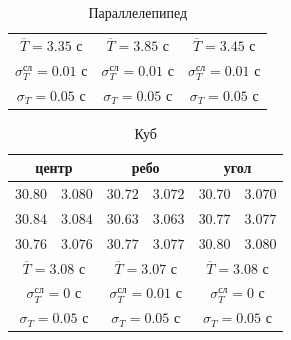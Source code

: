 \documentclass[a4paper,12pt]{article}
\begin{document}
\begin{enumerate}
\begin{table}[!h]
\begin{tabular}{|c|c|c|c|c|c|}
            \multicolumn{2}{|c|}{$\overline{T} = 3.35$ с} & \multicolumn{2}{|c|}{$\overline{T} = 3.85$ с} & \multicolumn{2}{|c|}{$\overline{T} = 3.45$ с} \\ 
            \multicolumn{2}{|c|}{$\sigma_T^{\text{сл}} = 0.01$ с} & \multicolumn{2}{|c|}{$\sigma_T^{\text{сл}} = 0.01$ с} & \multicolumn{2}{|c|}{$\sigma_T^{\text{сл}} = 0.01$ с} \\ 
            \multicolumn{2}{|c|}{$\sigma_T = 0.05$ с} & \multicolumn{2}{|c|}{$\sigma_T = 0.05$ с} & \multicolumn{2}{|c|}{$\sigma_T = 0.05$ с} \\ \hline
        \end{tabular}
        \caption{Параллелепипед}
    \end{table}

    \begin{table}[!h]
        \centering
        \begin{tabular}{|c|c|c|c|c|c|} \hline
            \multicolumn{2}{|c}{центр} & \multicolumn{2}{|c}{ребо} & \multicolumn{2}{|c|}{угол} \\ \hline
            $30.80$ & $3.080$ & $30.72$ & $3.072$ & $30.70$ & $3.070$ \\ \hline
            $30.84$ & $3.084$ & $30.63$ & $3.063$ & $30.77$ & $3.077$ \\ \hline
            $30.76$ & $3.076$ & $30.77$ & $3.077$ & $30.80$ & $3.080$ \\ \hline
            \multicolumn{2}{|c|}{$\overline{T} = 3.08$ с} & \multicolumn{2}{|c|}{$\overline{T} = 3.07$ с} & \multicolumn{2}{|c|}{$\overline{T} = 3.08$ с} \\ 
            \multicolumn{2}{|c|}{$\sigma_T^{\text{сл}} = 0$ с} & \multicolumn{2}{|c|}{$\sigma_T^{\text{сл}} = 0.01$ с} & \multicolumn{2}{|c|}{$\sigma_T^{\text{сл}} = 0$ с} \\ 
            \multicolumn{2}{|c|}{$\sigma_T = 0.05$ с} & \multicolumn{2}{|c|}{$\sigma_T = 0.05$ с} & \multicolumn{2}{|c|}{$\sigma_T = 0.05$ с} \\ \hline
        \end{tabular}
        \caption{Куб}
    \end{table}


\end{enumerate}
\end{document}
